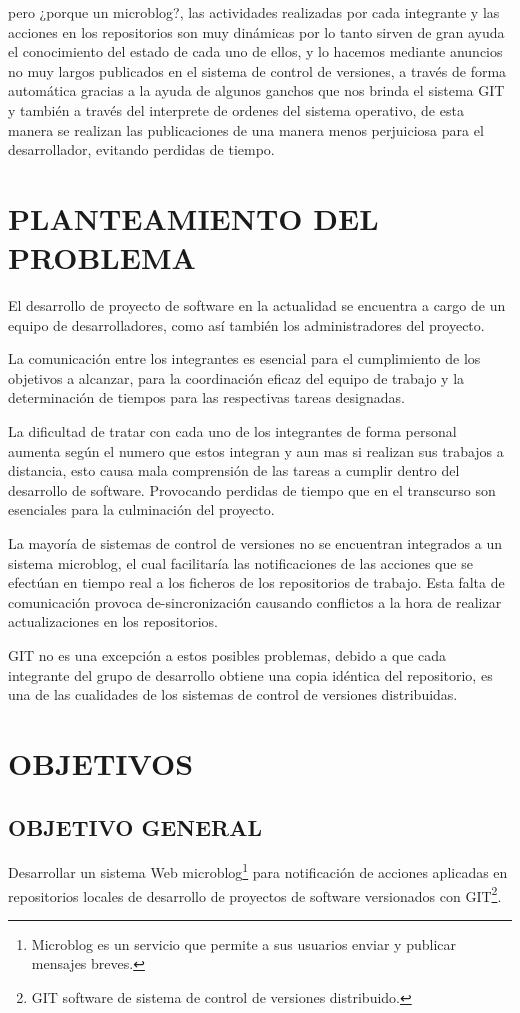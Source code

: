 pero ¿porque un microblog?, las actividades realizadas por cada integrante y las acciones en los repositorios son muy dinámicas por lo tanto sirven de gran ayuda el conocimiento del estado de cada uno de ellos, y lo hacemos mediante anuncios no muy largos publicados en el sistema de control de versiones, a través de forma automática gracias a la ayuda de algunos ganchos que nos brinda el sistema GIT y también a través del interprete de ordenes del sistema operativo, de esta manera se realizan las publicaciones de una manera menos perjuiciosa para el desarrollador, evitando perdidas de tiempo.

\section{PLANTEAMIENTO DEL PROBLEMA}
El desarrollo de proyecto de software en la actualidad se encuentra a cargo de un equipo de desarrolladores, como así también los administradores del proyecto.

La comunicación entre los integrantes es esencial para el cumplimiento de los objetivos a alcanzar, para la coordinación eficaz del equipo de trabajo y la determinación de tiempos para las respectivas tareas designadas.

La dificultad de tratar con cada uno de los integrantes de forma personal aumenta según el numero que estos integran y aun mas si realizan sus trabajos a distancia, esto causa mala comprensión de las tareas a cumplir dentro del desarrollo de software. Provocando perdidas de tiempo que en el transcurso son esenciales para la culminación del proyecto.

La mayoría de sistemas de control de versiones no se encuentran integrados a un sistema microblog, el cual facilitaría las notificaciones de las acciones que se efectúan en tiempo real a los ficheros de los repositorios de trabajo. Esta falta de comunicación provoca de-sincronización causando conflictos a la hora de realizar actualizaciones en los repositorios.

GIT no es una excepción a estos posibles problemas, debido a que cada integrante del grupo de desarrollo obtiene una copia idéntica del repositorio, es una de las cualidades de los sistemas de control de versiones distribuidas.

\section{OBJETIVOS}
\subsection{OBJETIVO GENERAL}
Desarrollar un sistema Web microblog\footnote{Microblog es un servicio que permite a sus usuarios enviar y publicar mensajes breves.
} para notificación de acciones aplicadas en repositorios locales de desarrollo de proyectos de software versionados con GIT\footnote{GIT software de sistema de control de versiones distribuido.
}.

